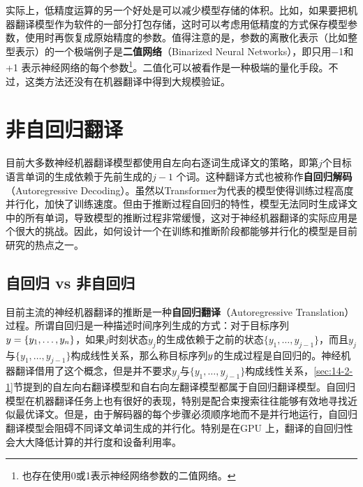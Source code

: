\parinterval 实际上，低精度运算的另一个好处是可以减少模型存储的体积。比如，如果要把机器翻译模型作为软件的一部分打包存储，这时可以考虑用低精度的方式保存模型参数，使用时再恢复成原始精度的参数。值得注意的是，参数的离散化表示（比如整型表示）的一个极端例子是{\small\sffamily\bfseries{二值网络}}（Binarized Neural Networks），即只用−1和+1 表示神经网络的每个参数\footnote{也存在使用0或1表示神经网络参数的二值网络。}。二值化可以被看作是一种极端的量化手段。不过，这类方法还没有在机器翻译中得到大规模验证。

\sectionnewpage
\section{非自回归翻译}

\parinterval 目前大多数神经机器翻译模型都使用自左向右逐词生成译文的策略，即第$j$个目标语言单词的生成依赖于先前生成的$j-1$ 个词。这种翻译方式也被称作{\small\sffamily\bfseries{自回归解码}}（Autoregressive Decoding）。虽然以Transformer为代表的模型使得训练过程高度并行化，加快了训练速度。但由于推断过程自回归的特性，模型无法同时生成译文中的所有单词，导致模型的推断过程非常缓慢，这对于神经机器翻译的实际应用是个很大的挑战。因此，如何设计一个在训练和推断阶段都能够并行化的模型是目前研究的热点之一。


\subsection{自回归 vs 非自回归}

\parinterval 目前主流的神经机器翻译的推断是一种{\small\sffamily\bfseries{自回归翻译}}（Autoregressive Translation）过程。所谓自回归是一种描述时间序列生成的方式：对于目标序列${y}=\{y_1,\dots,y_n\}$，如果$j$时刻状态$y_j$的生成依赖于之前的状态$\{y_1,\dots,y_{j-1}\}$，而且$y_j$与$\{y_1,\dots,y_{j-1}\}$构成线性关系，那么称目标序列${y}$的生成过程是自回归的。神经机器翻译借用了这个概念，但是并不要求$y_j$与$\{y_1,\dots,y_{j-1}\}$构成线性关系，\ref{sec:14-2-1}节提到的自左向右翻译模型和自右向左翻译模型都属于自回归翻译模型。自回归模型在机器翻译任务上也有很好的表现，特别是配合束搜索往往能够有效地寻找近似最优译文。但是，由于解码器的每个步骤必须顺序地而不是并行地运行，自回归翻译模型会阻碍不同译文单词生成的并行化。特别是在GPU 上，翻译的自回归性会大大降低计算的并行度和设备利用率。

